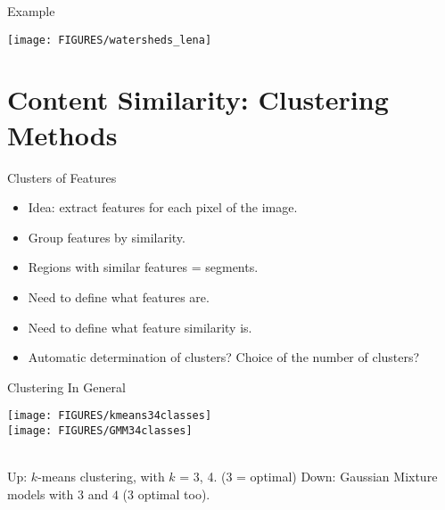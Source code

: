 \documentclass[9pt]{beamer}
\begin{document}
\begin{frame}{Example}
  \begin{center}
    \texttt{[image: FIGURES/watersheds\_lena]}
  \end{center}
\end{frame}


\section{Content Similarity: Clustering Methods}
\label{sec:clus}

\begin{frame}[t]{Clusters of Features}

  \begin{itemize}
  \item Idea: extract features for each pixel of the image.\vfill
  \item Group features by similarity.\vfill
  \item Regions with similar features = segments.\vfill
  \item Need to define what features are.\vfill
  \item Need to define what feature similarity is.\vfill
  \item Automatic determination of clusters? Choice of the number of clusters?
  \end{itemize}
\end{frame}


\begin{frame}[t]{Clustering In General}
  \begin{center}
    \texttt{[image: FIGURES/kmeans34classes]}\\
    \texttt{[image: FIGURES/GMM34classes]}\\
  \end{center}
  ~\\
  Up: $k$-means clustering, with $k$ = 3, 4. (3 = optimal)
  Down: Gaussian Mixture models with $3$ and  $4$ ($3$ optimal too).
\end{frame}
\end{document}
